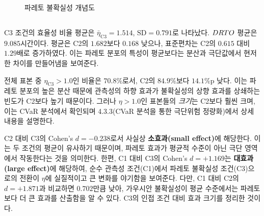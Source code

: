 \begin{figure}[htbp]
  \caption{파레토 불확실성 개념도}
  \label{fig:pareto_concept}
\end{figure}


\subsection{}
\label{subsec:c3_descriptive}

C3 조건의 효율성 비율 평균은 $\bar{\eta}_{\text{C3}} = 1.514$,
$\mathrm{SD} = 0.791$로 나타났다.
$DRTO$ 평균은 $9.085$시간이다.
평균은 C2의 $1.682$보다 $0.168$ 낮으나,
표준편차는 C2의 $0.615$ 대비 $1.29$배로 증가하였다.
이는 파레토 분포의 특성이
평균보다는 분산과 극단값에서 현저한 차이를 만들어냄을 보여준다.

 전체 표본 중 $\eta_{\text{C3}} > 1.0$인 비율은 $70.8\%$로서,
C2의 $84.9\%$보다 $14.1$\%p 낮다.
이는 파레토 분포의 높은 분산 때문에 관측성의 하향 효과가
불확실성의 상향 효과를 상쇄하는 빈도가 C2보다 높기 때문이다.
그러나 $\eta > 1.0$인 표본들의 \textit{크기}는 C2보다 훨씬 크며,
이는 CVaR 분석에서 확인되며 4.3.3(CVaR 분석을 통한 극단위험 정량화)에서 상세 내용을 설명한다.

 C2 대비 C3의 Cohen's $d = -0.238$로서 사실상 \textbf{소효과(small effect)}에 해당한다.
이는 두 조건의 평균이 유사하기 때문이며, 파레토 효과가
평균적 수준이 아닌 극단 영역에서 작동한다는 것을 의미한다.
한편, C1 대비 C3의 Cohen's $d = +1.169$는 \textbf{대효과(large effect)}에
해당하여, 순수 관측성 조건(C1)에서 파레토 불확실성 조건(C3)으로의
전환이 $\eta$에 실질적이고 큰 변화를 야기함을 보여준다.
다만, C1 대비 C2의 $d = +1.871$과 비교하면 $0.702$만큼 낮아,
가우시안 불확실성이 평균 수준에서는 파레토보다 더 큰 효과를 산출함을 알 수 있다.
 C3의 인접 조건 대비 효과 크기를 정리한 것이다.

